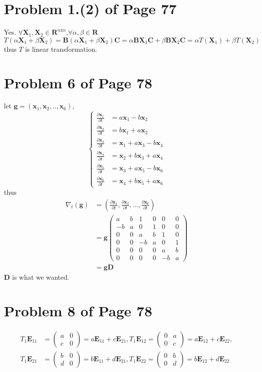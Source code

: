 \documentclass[12pt,a4paper]{article}
\newcommand{\mysection}[2]{
\section{Problem #1 of Page #2}	
	}
\begin{document}
\mysection{1.(2)}{77}
Yes. $\forall \bm{X}_1 ,\bm{X}_2 \in \mathbf{R}^{n\text{x}n}$,$\forall 
\alpha,\beta \in \mathbf{R}
$\\
\[T(\alpha \bm{X}_1 + \beta \bm{X}_2)
 = \bm{B}(\alpha \bm{X}_1 + \beta \bm{X}_2)\bm{C} 
 = \alpha \bm{B}\bm{X}_1\bm{C} + \beta \bm{BX}_2\bm{C} = \alpha T(\bm{X}_1) + \beta T(\bm{X}_2) \]
thus $T$ is linear transformation.
\mysection{6}{78}
let $\bm{g} = (\bm{x}_1,\bm{x}_2,..,\bm{x}_6)$,
\begin{equation*}
\left\lbrace 
\begin{split}
\frac{\partial \bm{x}_1}{\partial t} &= a\bm{x}_1-b\bm{x}_2 \\
\frac{\partial \bm{x}_2}{\partial t} &= b\bm{x}_1+a\bm{x}_2\\
\frac{\partial \bm{x}_3}{\partial t} &=\bm{x}_1 + a\bm{x}_3 - b\bm{x}_4 \\
\frac{\partial \bm{x}_4}{\partial t}&=\bm{x}_2 + b\bm{x}_3 + a\bm{x}_4\\
\frac{\partial \bm{x}_5}{\partial t}&=\bm{x}_3 + a\bm{x}_5 - b\bm{x}_6\\
\frac{\partial \bm{x}_6}{\partial t}&= \bm{x}_4 +b\bm{x}_5 + a\bm{x}_6 
\end{split}
\right .
\end{equation*}
thus 
\begin{equation*}
\begin{split}
\nabla_t(\bm{g}) &= (\frac{\partial \bm{x}_1}{\partial t},
\frac{\partial \bm{x}_2}{\partial t},...,\frac{\partial \bm{x}_6}{\partial t}) \\
&=\bm{g} \left(
\begin{array}{cccccc}
a & b & 1 &0 &0 &0 \\
-b &a & 0 &1&0 &0 \\
0 &0 &a &b &1 &0\\
0 &0 &-b&a&0 &1\\
0 &0 &0 &0&a&b\\
0 &0 &0 &0 &-b &a
\end{array}
\right)\\
&= \bm{gD}
\end{split}
\end{equation*}
$\bm D$ is what we wanted.
\mysection{8}{78}
\[
\begin{split}
T_1\bm{E}_{11} &=\left(  \begin{array}{cc}
a & 0 \\
c & 0
\end{array}
\right)=a\bm{E}_{11} + c\bm{E}_{21},
T_1\bm{E}_{12} =\left(  \begin{array}{cc}
0 & a \\
0 & c
\end{array}
\right)
= a\bm{E}_{12} + c\bm{E}_{22},  \\
T_1\bm{E}_{21} &=\left(  \begin{array}{cc}
b & 0 \\
d & 0
\end{array}
\right)
=b\bm{E}_{11} + d\bm{E}_{21}, 
T_1\bm{E}_{22} =\left(  \begin{array}{cc}
0 & b \\
0 & d
\end{array}
\right)
=b\bm{E}_{12} + d\bm{E}_{22}
\end{split}
\]
\end{document}

